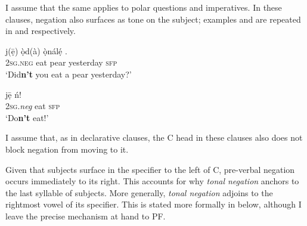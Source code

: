 \documentclass[output=paper,colorlinks,citecolor=brown,
]{langscibook}
\begin{document}


I assume that the same applies to polar questions and imperatives. In these clauses, negation also surfaces as tone on the subject; examples  and  are repeated in  and  respectively. 

\ea \label{ex:chaperon:pol}
\gll {} j(\={ẹ}) \`{ọ}d(\`{a}) \`{ọ}n\'{a}l\'{ẹ} .\\
        \textsc{2sg}.\textsc{neg}     eat     pear     yesterday     \textsc{sfp}\\
       \glt  `Did\textbf{n’t} you eat a pear yesterday?'
\z

\ea \label{ex:chaperon:imp}
\gll {} j\={ẹ} \'{n}!\\
        \textsc{2sg}.\textit{neg}     eat     \textsc{sfp}\\
        \glt `Do\textbf{n’t} eat!'
\z


I assume that, as in declarative clauses, the C\xhead{} head in these clauses also does not block negation from moving to it.

Given that subjects surface in the specifier to the left of C\xhead{}, pre-verbal negation occurs immediately to its right. This accounts for why \textit{tonal negation} anchors to the last syllable of subjects. More generally, \textit{tonal negation} adjoins to the rightmost vowel of its specifier. This is stated more formally in  below, although I leave the precise mechanism at hand to PF.
\end{document}
